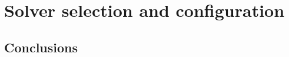 \chapter{Solver selection and configuration}
\label{chapter:solver configuration}

































	
	
	






%



\section{Conclusions}
\label{subseq:conclusions}







